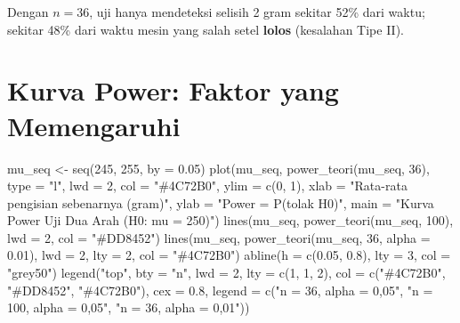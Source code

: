 \documentclass[
  indonesian,
  letterpaper,
]{book}
\newenvironment{Shaded}{\begin{snugshade}}{\end{snugshade}}
\newcommand{\AttributeTok}[1]{\textcolor[rgb]{0.40,0.45,0.13}{#1}}
\newcommand{\DecValTok}[1]{\textcolor[rgb]{0.68,0.00,0.00}{#1}}
\newcommand{\FloatTok}[1]{\textcolor[rgb]{0.68,0.00,0.00}{#1}}
\newcommand{\FunctionTok}[1]{\textcolor[rgb]{0.28,0.35,0.67}{#1}}
\newcommand{\NormalTok}[1]{\textcolor[rgb]{0.00,0.23,0.31}{#1}}
\newcommand{\OtherTok}[1]{\textcolor[rgb]{0.00,0.23,0.31}{#1}}
\newcommand{\StringTok}[1]{\textcolor[rgb]{0.13,0.47,0.30}{#1}}
\begin{document}
Dengan \(n = 36\), uji hanya mendeteksi selisih 2 gram sekitar 52\% dari
waktu; sekitar 48\% dari waktu mesin yang salah setel \textbf{lolos}
(kesalahan Tipe II).

\section{Kurva Power: Faktor yang
Memengaruhi}\label{kurva-power-faktor-yang-memengaruhi}

\begin{Shaded}
\begin{Highlighting}[]
\NormalTok{mu\_seq }\OtherTok{\textless{}{-}} \FunctionTok{seq}\NormalTok{(}\DecValTok{245}\NormalTok{, }\DecValTok{255}\NormalTok{, }\AttributeTok{by =} \FloatTok{0.05}\NormalTok{)}
\FunctionTok{plot}\NormalTok{(mu\_seq, }\FunctionTok{power\_teori}\NormalTok{(mu\_seq, }\DecValTok{36}\NormalTok{), }\AttributeTok{type =} \StringTok{"l"}\NormalTok{, }\AttributeTok{lwd =} \DecValTok{2}\NormalTok{, }\AttributeTok{col =} \StringTok{"\#4C72B0"}\NormalTok{, }\AttributeTok{ylim =} \FunctionTok{c}\NormalTok{(}\DecValTok{0}\NormalTok{, }\DecValTok{1}\NormalTok{),}
     \AttributeTok{xlab =} \StringTok{"Rata{-}rata pengisian sebenarnya (gram)"}\NormalTok{, }\AttributeTok{ylab =} \StringTok{"Power = P(tolak H0)"}\NormalTok{,}
     \AttributeTok{main =} \StringTok{"Kurva Power Uji Dua Arah (H0: mu = 250)"}\NormalTok{)}
\FunctionTok{lines}\NormalTok{(mu\_seq, }\FunctionTok{power\_teori}\NormalTok{(mu\_seq, }\DecValTok{100}\NormalTok{), }\AttributeTok{lwd =} \DecValTok{2}\NormalTok{, }\AttributeTok{col =} \StringTok{"\#DD8452"}\NormalTok{)}
\FunctionTok{lines}\NormalTok{(mu\_seq, }\FunctionTok{power\_teori}\NormalTok{(mu\_seq, }\DecValTok{36}\NormalTok{, }\AttributeTok{alpha =} \FloatTok{0.01}\NormalTok{), }\AttributeTok{lwd =} \DecValTok{2}\NormalTok{, }\AttributeTok{lty =} \DecValTok{2}\NormalTok{, }\AttributeTok{col =} \StringTok{"\#4C72B0"}\NormalTok{)}
\FunctionTok{abline}\NormalTok{(}\AttributeTok{h =} \FunctionTok{c}\NormalTok{(}\FloatTok{0.05}\NormalTok{, }\FloatTok{0.8}\NormalTok{), }\AttributeTok{lty =} \DecValTok{3}\NormalTok{, }\AttributeTok{col =} \StringTok{"grey50"}\NormalTok{)}
\FunctionTok{legend}\NormalTok{(}\StringTok{"top"}\NormalTok{, }\AttributeTok{bty =} \StringTok{"n"}\NormalTok{, }\AttributeTok{lwd =} \DecValTok{2}\NormalTok{, }\AttributeTok{lty =} \FunctionTok{c}\NormalTok{(}\DecValTok{1}\NormalTok{, }\DecValTok{1}\NormalTok{, }\DecValTok{2}\NormalTok{),}
       \AttributeTok{col =} \FunctionTok{c}\NormalTok{(}\StringTok{"\#4C72B0"}\NormalTok{, }\StringTok{"\#DD8452"}\NormalTok{, }\StringTok{"\#4C72B0"}\NormalTok{), }\AttributeTok{cex =} \FloatTok{0.8}\NormalTok{,}
       \AttributeTok{legend =} \FunctionTok{c}\NormalTok{(}\StringTok{"n = 36, alpha = 0,05"}\NormalTok{, }\StringTok{"n = 100, alpha = 0,05"}\NormalTok{, }\StringTok{"n = 36, alpha = 0,01"}\NormalTok{))}
\end{Highlighting}
\end{Shaded}
\end{document}
